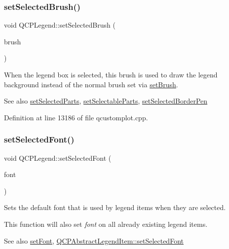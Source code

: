 \subsubsection{\texorpdfstring{set\+Selected\+Brush()}{setSelectedBrush()}}
{\footnotesize\ttfamily void Q\+C\+P\+Legend\+::set\+Selected\+Brush (\begin{DoxyParamCaption}\item[{const Q\+Brush \&}]{brush }\end{DoxyParamCaption})}

When the legend box is selected, this brush is used to draw the legend background instead of the normal brush set via \hyperlink{class_q_c_p_legend_a497bbcd38baa3598c08e2b3f48103f23}{set\+Brush}.

\begin{DoxySeeAlso}{See also}
\hyperlink{class_q_c_p_legend_a2aee309bb5c2a794b1987f3fc97f8ad8}{set\+Selected\+Parts}, \hyperlink{class_q_c_p_legend_a9ce60aa8bbd89f62ae4fa83ac6c60110}{set\+Selectable\+Parts}, \hyperlink{class_q_c_p_legend_a2c35d262953a25d96b6112653fbefc88}{set\+Selected\+Border\+Pen} 
\end{DoxySeeAlso}


Definition at line 13186 of file qcustomplot.\+cpp.

\mbox{\label{class_q_c_p_legend_ab580a01c3c0a239374ed66c29edf5ad2}} 
\subsubsection{\texorpdfstring{set\+Selected\+Font()}{setSelectedFont()}}
{\footnotesize\ttfamily void Q\+C\+P\+Legend\+::set\+Selected\+Font (\begin{DoxyParamCaption}\item[{const Q\+Font \&}]{font }\end{DoxyParamCaption})}

Sets the default font that is used by legend items when they are selected.

This function will also set {\itshape font} on all already existing legend items.

\begin{DoxySeeAlso}{See also}
\hyperlink{class_q_c_p_legend_aa4cda8499e3cb0f3be415edc02984c73}{set\+Font}, \hyperlink{class_q_c_p_abstract_legend_item_a91db5aee48617a9d3206e61376807365}{Q\+C\+P\+Abstract\+Legend\+Item\+::set\+Selected\+Font} 
\end{DoxySeeAlso}


